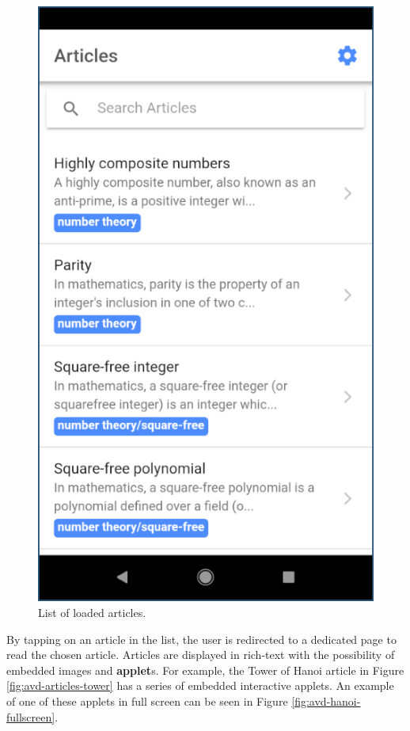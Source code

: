 \documentclass[12pt]{report}
\begin{document}
\begin{figure}
    \centering
    \includegraphics[scale=0.5]{images/avd-articles-loaded.png}
    \caption{List of loaded articles.}
    \label{fig:avd-articles-loaded}
\end{figure}

By tapping on an article in the list, the user is redirected to a dedicated page
to read the chosen article. Articles are displayed in rich-text with the
possibility of embedded images and \textbf{applet}s. For example, the Tower of
Hanoi article in Figure \ref{fig:avd-articles-tower} has a series of embedded
interactive applets. An example of one of these applets in full screen can be
seen in Figure \ref{fig:avd-hanoi-fullscreen}.
\end{document}
